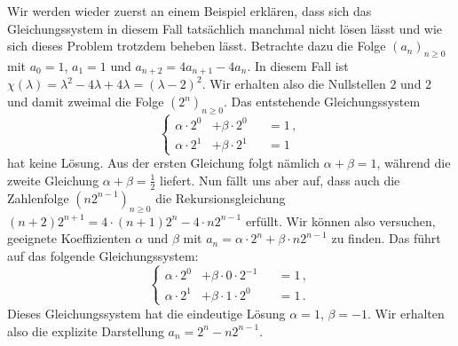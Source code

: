 Wir werden wieder zuerst an einem Beispiel erklären, dass sich das Gleichungssystem in diesem Fall tatsächlich manchmal nicht lösen lässt und wie sich dieses Problem trotzdem beheben lässt. Betrachte dazu die Folge $(a_n)_{n\geqslant 0}$ mit $a_0=1$, $a_1=1$ und $a_{n+2}=4a_{n+1}-4a_n$. In diesem Fall ist $\chi(\lambda)=\lambda^2-4\lambda+4\lambda=(\lambda-2)^2$. Wir erhalten also die Nullstellen $2$ und $2$ und damit zweimal die Folge $(2^n)_{n\geqslant 0}$. Das entstehende Gleichungssystem
\begin{equation*}
	\left\{\begin{alignedat}{2}
		\alpha\cdot 2^0&+\beta\cdot 2^0&&=1\,,\\
		\alpha\cdot 2^1&+\beta\cdot 2^1&&=1
	\end{alignedat}\right.
\end{equation*}
hat keine Lösung. Aus der ersten Gleichung folgt nämlich $\alpha+\beta=1$, während die zweite Gleichung $\alpha+\beta=\frac12$ liefert. Nun fällt uns aber auf, dass auch die Zahlenfolge $(n2^{n-1})_{n\geqslant 0}$ die Rekursionsgleichung $(n+2)2^{n+1}=4\cdot (n+1)2^{n}-4\cdot n2^{n-1}$ erfüllt. Wir können also versuchen, geeignete Koeffizienten $\alpha$ und $\beta$ mit $a_n=\alpha\cdot 2^n+\beta\cdot n2^{n-1}$ zu finden. Das führt auf das folgende Gleichungssystem:
\begin{equation*}
	\left\{\begin{alignedat}{2}
		\alpha\cdot 2^0&+\beta\cdot 0\cdot 2^{-1}&&=1\,,\\
		\alpha\cdot 2^1&+\beta\cdot 1\cdot 2^0&&=1\,.
	\end{alignedat}\right.
\end{equation*}
Dieses Gleichungssystem hat die eindeutige Lösung $\alpha=1$, $\beta=-1$. Wir erhalten also die explizite Darstellung $a_n=2^n-n2^{n-1}$.

